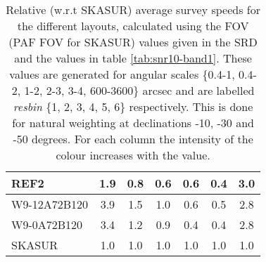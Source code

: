 \begin{table}[!htp]
{{\begin{tabular}{|lcccccc|}
REF2 & 1.9 \cellcolor{blue!31.32} & 0.8 \cellcolor{red!18.00} & 0.6 \cellcolor{green!18.00} & 0.6 \cellcolor{orange!27.00} & 0.4 \cellcolor{purple!21.11} & 3.0 \cellcolor{blue!60.00}\\ \hline 
W9-12A72B120 & 3.9 \cellcolor{blue!60.00} & 1.5 \cellcolor{red!60.00} & 1.0 \cellcolor{green!60.00} & 0.6 \cellcolor{orange!31.50} & 0.5 \cellcolor{purple!24.22} & 2.8 \cellcolor{blue!54.75}\\ \hline 
W9-0A72B120 & 3.4 \cellcolor{blue!52.83} & 1.2 \cellcolor{red!44.25} & 0.9 \cellcolor{green!45.18} & 0.4 \cellcolor{orange!18.00} & 0.4 \cellcolor{purple!18.00} & 2.8 \cellcolor{blue!54.75}\\ \hline 
SKASUR & 1.0 \cellcolor{blue!18.00} & 1.0 \cellcolor{red!28.50} & 1.0 \cellcolor{green!58.76} & 1.0 \cellcolor{orange!60.00} & 1.0 \cellcolor{purple!60.00} & 1.0 \cellcolor{blue!18.00}\tabularnewline \hline 
\end{tabular}}\hfill \\

\caption{Relative (w.r.t SKASUR) average survey speeds for the different layouts, calculated using the FOV (PAF FOV for SKASUR) values given in the SRD \cite{srd} and the values in table \ref{tab:snr10-band1}. These values are generated for angular scales \{0.4-1, 0.4-2, 1-2, 2-3, 3-4, 600-3600\} arcsec and are labelled {\it resbin} \{1, 2, 3, 4, 5, 6\} respectively. This is done for natural weighting at declinations -10, -30 and -50 degrees. For each column the intensity of the colour increases with the value.}\label{tab:speed_avg-band1}}
 \end{table}